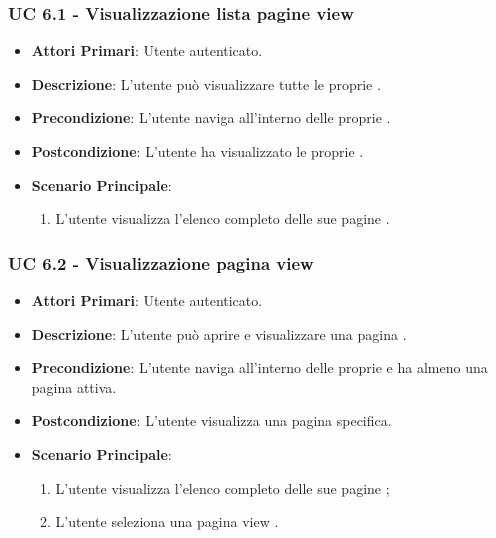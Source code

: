 			\subsubsection{UC 6.1 - Visualizzazione lista pagine view}
			\begin{itemize}
				\item \textbf{Attori Primari}: Utente autenticato.
				\item \textbf{Descrizione}: L'utente può visualizzare tutte le proprie .
				\item \textbf{Precondizione}: L'utente naviga all'interno delle proprie .
				\item \textbf{Postcondizione}: L'utente ha visualizzato le proprie .
				\item \textbf{Scenario Principale}:
				\begin{enumerate}
					\item{L'utente visualizza l'elenco completo delle sue pagine .}
				\end{enumerate}	
			\end{itemize}

			\subsubsection{UC 6.2 - Visualizzazione pagina view}
			\begin{itemize}
				\item \textbf{Attori Primari}: Utente autenticato.
				\item \textbf{Descrizione}: L'utente può aprire e visualizzare una pagina .
				\item \textbf{Precondizione}: L'utente naviga all'interno delle proprie  e ha almeno una pagina  attiva.
				\item \textbf{Postcondizione}: L'utente visualizza una pagina  specifica.
				\item \textbf{Scenario Principale}:
				\begin{enumerate}
					\item{L'utente visualizza l'elenco completo delle sue pagine ;}
					\item{L'utente seleziona una pagina view .}
				\end{enumerate}	
			\end{itemize}


